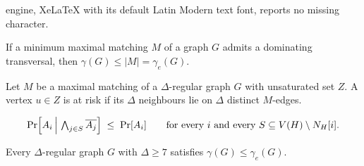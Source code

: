 \documentclass[10pt,a4paper]{amsart}
\newcommand{\edom}{\gamma_{e}}
\begin{document}
engine, XeLaTeX with its default Latin Modern text font, reports no missing character.
\begin{proposition}[Reduction]\label{prop:reduction}
If a minimum maximal matching $M$ of a graph $G$ admits a dominating
transversal, then $\gamma(G) \le |M| = \edom(G)$.
\end{proposition}

\begin{definition}\label{def:atrisk}
Let $M$ be a maximal matching of a $\Delta$-regular graph $G$ with unsaturated set
$Z$. A vertex $u \in Z$ is at risk if its $\Delta$ neighbours lie on $\Delta$
distinct $M$-edges.
\end{definition}

\begin{equation}\label{eq:lopsi}
  \Pr\Bigl[A_i \,\Big|\, \textstyle\bigwedge_{j \in S} \overline{A_j}\Bigr]
  \;\le\; \Pr[A_i]
  \qquad\text{for every } i \text{ and every } S \subseteq V(H)\setminus N_H[i].
\end{equation}

\begin{theorem}\label{thm:lll}
Every $\Delta$-regular graph $G$ with $\Delta \ge 7$ satisfies
$\gamma(G) \le \edom(G)$.
\end{theorem}
\end{document}

